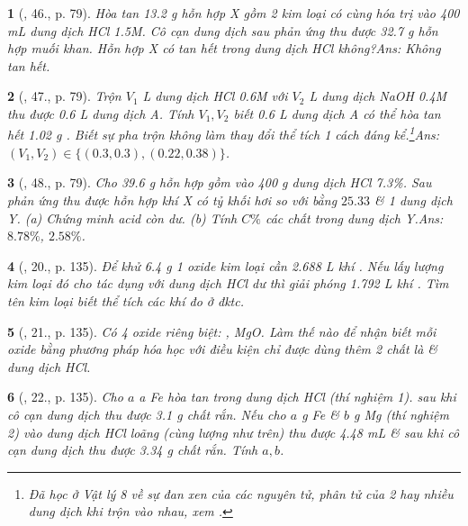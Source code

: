 \documentclass{article}
\newtheorem{baitoan}{}
\begin{document}
\begin{baitoan}[\cite{An_Hoa_Hoc_nang_cao_8_9}, 46., p. 79]
	Hòa tan {\rm13.2 g} hỗn hợp X gồm 2 kim loại có cùng hóa trị vào {\rm400 mL} dung dịch {\rm HCl 1.5M}. Cô cạn dung dịch sau phản ứng thu được {\rm32.7 g} hỗn hợp muối khan. Hỗn hợp X có tan hết trong dung dịch {\rm HCl} không?\hfill{\sf Ans: Không tan hết.}
\end{baitoan}

\begin{baitoan}[\cite{An_Hoa_Hoc_nang_cao_8_9}, 47., p. 79]
	Trộn $V_1$ {\rm L} dung dịch {\rm HCl 0.6M} với $V_2$ {\rm L} dung dịch {\rm NaOH 0.4M} thu được {\rm0.6 L} dung dịch A. Tính $V_1,V_2$ biết {\rm0.6 L} dung dịch A có thể hòa tan hết {\rm1.02 g }. Biết sự pha trộn không làm thay đổi thể tích 1 cách đáng kể.\footnote{Đã học ở Vật lý 8 về sự đan xen của các nguyên tử, phân tử của 2 hay nhiều dung dịch khi trộn vào nhau, xem \cite[\S19, pp. 68--70]{SGK_Vat_Ly_8}.}\hfill{\sf Ans: $(V_1,V_2)\in\{(0.3,0.3),(0.22,0.38)\}$.}
\end{baitoan}

\begin{baitoan}[\cite{An_Hoa_Hoc_nang_cao_8_9}, 48., p. 79]
	Cho {\rm39.6 g} hỗn hợp gồm {\rm{}} vào {\rm400 g} dung dịch {\rm HCl 7.3\%}. Sau phản ứng thu được hỗn hợp khí X có tỷ khối hơi so với {\rm{}} bằng $25.33$ \& 1 dung dịch Y. (a) Chứng minh acid còn dư. (b) Tính $C\%$ các chất trong dung dịch Y.\hfill{\sf Ans: $8.78\%$, $2.58\%$.}
\end{baitoan}

\begin{baitoan}[\cite{An_Hoa_Hoc_nang_cao_8_9}, 20., p. 135]
	Để khử {\rm6.4 g} 1 oxide kim loại cần {\rm2.688 L} khí {\rm{}}. Nếu lấy lượng kim loại đó cho tác dụng với dung dịch {\rm HCl} dư thì giải phóng {\rm1.792 L} khí {\rm{}}. Tìm tên kim loại biết thể tích các khí đo ở đktc.
\end{baitoan}

\begin{baitoan}[\cite{An_Hoa_Hoc_nang_cao_8_9}, 21., p. 135]
	Có 4 oxide riêng biệt: {\rm{}, MgO}. Làm thế nào để nhận biết mỗi oxide bằng phương pháp hóa học với điều kiện chỉ được dùng thêm 2 chất là {\rm{}} \& dung dịch {\rm HCl}.
\end{baitoan}

\begin{baitoan}[\cite{An_Hoa_Hoc_nang_cao_8_9}, 22., p. 135]
	Cho $a$ {\rm a Fe} hòa tan trong dung dịch {\rm HCl} (thí nghiệm 1). sau khi cô cạn dung dịch thu được {\rm3.1 g} chất rắn. Nếu cho $a$ {\rm g Fe} \& $b$ {\rm g Mg} (thí nghiệm 2) vào dung dịch {\rm HCl} loãng (cùng lượng như trên) thu được {\rm4.48 mL } \& sau khi cô cạn dung dịch thu được {\rm3.34 g} chất rắn. Tính $a,b$.
\end{baitoan}
\end{document}
